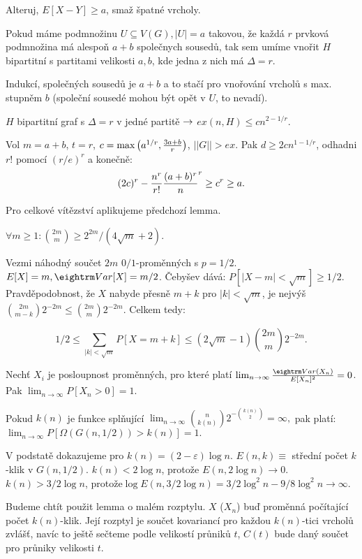 Alteruj,  $E[X-Y] \ge a$, smaž špatné vrcholy.

\lem{} Pokud máme podmnožinu $U \subseteq V(G), |U|=a$ takovou, že každá $r$ prvková podmnožina
má alespoň $a+b$ společnych sousedů, tak sem umíme vnořit $H$ bipartitní s partitami velikosti
$a,b$, kde jedna z nich má $\Delta = r$.

\prf{} Indukcí, společných sousedů je $a+b$ a to stačí pro vnořování vrcholů s max. stupněm
$b$ (společní sousedé mohou být opět v $U$, to nevadí).

\thm{} $H$ bipartitní graf s $\Delta = r$ v jedné partitě $\rightarrow$ $ex(n,H) \le cn^{2-1/r}$.

\prf{} Vol $m = a+b$, $t = r$, $c = \max\left(a^{1/r},{3a+b \over r}\right)$, $||G|| > ex$.
Pak $d \ge 2cn^{1-1/r}$, odhadni $r!$ pomocí $(r/e)^r$ a konečně:
$$ (2c)^r - {n^r \over r!} {(a+b)^r \over n}^r \ge c^r \ge a. $$

Pro celkové vítězství aplikujeme předchozí lemma.


\thm{} $\forall m\ge 1: {2m \choose m} \ge 2^{2m}/(4\sqrt{m}+2)$.

\prf{} Vezmi náhodný součet $2m$ $0/1$-proměnných s $p=1/2$. $E[X] = m, \var[X] = m/2$. Čebyšev dává: $P[|X-m| < \sqrt{m}] \ge 1/2$. 
Pravděpodobnost, že $X$ nabyde přesně $m+k$ pro $|k| < \sqrt{m}$, 
je nejvýš ${2m \choose m-k}2^{-2m} \le {2m \choose m}2^{-2m}$.
Celkem tedy:

$$1/2 \le \sum_{|k| < \sqrt{m}} P[X = m+k] \le (2\sqrt{m} -1) {2m \choose m} 2^{-2m}.$$

 Nechť $X_i$ je posloupnost proměnných, pro které platí $\lim_{n \rightarrow \infty} {\var(X_n) \over E[X_n]^2} = 0$.
Pak $\lim_{n \rightarrow \infty} P[X_n > 0] = 1.$

\lem{} Pokud $k(n)$ je funkce splňující
$ \lim_{n \rightarrow \infty} {n \choose k(n)} 2^{-{k(n) \choose 2}} = \infty, $
pak platí:
$ \lim_{n \rightarrow \infty} P[\Omega(G(n,1/2)) > k(n)] = 1.$

\prf{} V podstatě dokazujeme pro $k(n) = (2-\varepsilon) \log n$. $E(n,k) \equiv$
střední počet $k$-klik v $G(n,1/2)$.  $k(n) < 2 \log n$, protože $E(n,2 \log n)
\rightarrow 0$. $k(n) > 3/2 \log n$, protože\hfil\break $\log E(n,3/2 \log n) = 3/2 \log^2
n - 9/8 \log^2 n \rightarrow \infty$.

Budeme chtít použit lemma o malém rozptylu. $X$ ($X_n$) buď proměnná počítající
počet $k(n)$-klik. Její rozptyl je součet kovariancí pro každou $k(n)$-tici
vrcholů zvlášť, navíc to ještě sečteme podle velikostí průniků $t$,  $C(t)$
bude daný součet pro průniky velikosti $t$.

